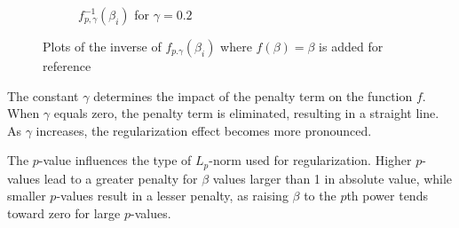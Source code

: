 \begin{figure}[H]
\begin{subfigure}{0.45\textwidth}
    \caption{$f_{p, \gamma}^{-1}(\beta_i)$ for $\gamma = 0.2$}
    \label{fig:inv_0.2}
  \end{subfigure}
  \caption{Plots of the inverse of $f_{p. \gamma}(\beta_i)$ where $f(\beta) = \beta$ is added for reference}
  \label{fig:penalized_lsq_inv}
\end{figure}
The constant $\gamma$ determines the impact of the penalty term on the function $f$. When $\gamma$ equals zero, the penalty term is eliminated, resulting in a straight line. As $\gamma$ increases, the regularization effect becomes more pronounced.

The $p$-value influences the type of $L_p$-norm used for regularization. Higher $p$-values lead to a greater penalty for $\beta$ values larger than 1 in absolute value, while smaller $p$-values result in a lesser penalty, as raising $\beta$ to the $p$th power tends toward zero for large $p$-values.

